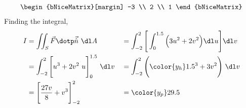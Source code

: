 \begin{enumerate}
\begin{align}
\begin{bNiceMatrix}[margin]
                  -3 \\ 2 \\ 1
              \end{bNiceMatrix}
          \end{align}
          Finding the integral,
          \begin{align}
              I               & = \iint_S \vec{F} \dotp \vec{\hat{n}}\ \dl A &
                              & = \int_{-2}^{2}
              \Bigg[\int_{0}^{1.5} \Big( 3u^2 + 2v^2 \Big)
              \dl u \Bigg] \dl v                                               \\
                              & = \int_{-2}^{2}
              \Bigg[u^3 + 2v^2\ u \Bigg]_0^{1.5}
              \ \dl v         &
                              & = \int_{-2}^{2}
              \Bigg( {\color{y_h} 1.5^3 + 3v^2} \Bigg)\ \dl v                  \\
                              & = \Bigg[ \frac{27v}{8} + v^3
              \Bigg]_{-2}^{2} &
                              & = \color{y_p} 29.5
          \end{align}


\end{enumerate}
